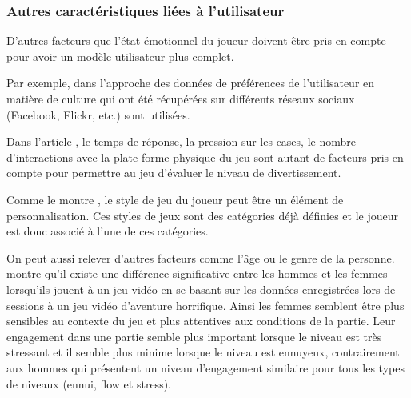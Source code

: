 \documentclass[11pt]{article}
\begin{document}
	    \subsubsection{Autres caractéristiques liées à l'utilisateur} \label{sec:caractéristiques}
	        D’autres facteurs que l’état émotionnel du joueur doivent être pris en compte pour avoir un modèle utilisateur plus complet.\par
	        Par exemple, dans l'approche \cite{noor_et_al._2009} des données de préférences de l’utilisateur en matière de culture qui ont été récupérées sur différents réseaux sociaux (Facebook, Flickr, etc.) sont utilisées.\par
	        Dans l’article \cite{yannakakis_et_al._2009}, le temps de réponse, la pression sur les cases, le nombre d’interactions avec la plate-forme physique du jeu sont autant de facteurs pris en compte pour permettre au jeu d'évaluer le niveau de divertissement.\par
	        Comme le montre \cite{Mostefai_et_al._2019}, le style de jeu du joueur peut être un élément de personnalisation. 
	        Ces styles de jeux sont des catégories déjà définies et le joueur est donc associé à l'une de ces catégories.\par
	        On peut aussi relever d’autres facteurs comme l’âge ou le genre de la personne. \cite{carofiglio_et_al._2019} montre qu'il existe une différence significative entre les hommes et les femmes lorsqu’ils jouent à un jeu vidéo en se basant sur les données enregistrées lors de sessions à un jeu vidéo d’aventure horrifique. 
	        Ainsi les femmes semblent être plus sensibles au contexte du jeu et plus attentives aux conditions de la partie. 
	        Leur engagement dans une partie semble plus important lorsque le niveau est très stressant et il semble plus minime lorsque le niveau est ennuyeux, contrairement aux hommes qui présentent un niveau d’engagement similaire  pour tous les types de niveaux (ennui, flow et stress).
\end{document}
